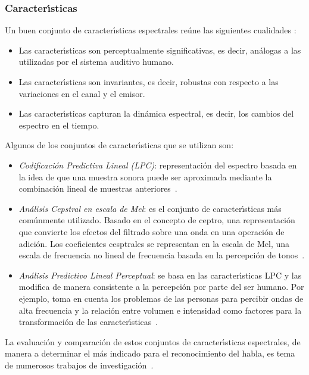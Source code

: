 \subsubsection{Caracter{\'\i}sticas}
Un buen conjunto de caracter{\'\i}sticas espectrales re\'une las siguientes cualidades \cite{KesarkarFeature2003}:
\begin{itemize}
\item Las caracter{\'\i}sticas son perceptualmente significativas, es decir, an\'alogas a las utilizadas por el sistema 
auditivo humano.
\item Las caracter{\'\i}sticas son invariantes, es decir, robustas con respecto a las variaciones en el canal y el emisor.
\item Las caracter{\'\i}sticas capturan la din\'amica espectral, es decir, los cambios del espectro en el tiempo.
\end{itemize}

Algunos de los conjuntos de caracter{\'\i}sticas que se utilizan son:
\begin{itemize}
\item \emph{Codificaci\'on Predictiva Lineal (LPC)}: representaci\'on del espectro basada en la idea de que una muestra 
sonora puede ser aproximada mediante la combinaci\'on lineal de muestras \mbox{anteriores \cite{KesarkarFeature2003}}.
\item \emph{An\'alisis Cepstral en escala de Mel}: es el conjunto de caracter{\'\i}sticas m\'as com\'unmente utilizado. 
Basado en el concepto de ceptro, una representaci\'on que convierte los efectos del filtrado sobre una onda en una 
operaci\'on de adici\'on. Los coeficientes cesptrales se representan en la escala de Mel, una escala de frecuencia no
lineal de frecuencia basada en la percepci\'on de \mbox{tonos \cite{Ellis08anintroduction}}.
\item \emph{An\'alisis Predictivo Lineal Perceptual}: se basa en las caracter{\'\i}sticas LPC y las modifica de manera 
consistente a la percepci\'on por parte del ser humano. Por ejemplo, toma en cuenta los problemas de las personas para 
percibir ondas de alta frecuencia y la relaci\'on entre volumen e intensidad como factores para la transformaci\'on de las 
\mbox{caracter{\'\i}sticas \cite{Jurafsky}}. 
\end{itemize}

La evaluaci\'on y comparaci\'on de estos conjuntos de caracter{\'\i}sticas espectrales, de manera a determinar el m\'as 
indicado para el reconocimiento del habla, es tema de numerosos trabajos de 
\mbox{investigaci\'on \cite{DorraComparative2006, SarosiComparison2011, ElminirEvaluation2012}}.